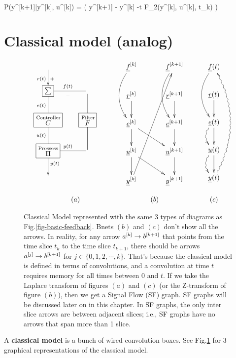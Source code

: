 \beq\color{blue}
P(y^{[k+1]}|y^{[k]}, u^{[k]})
=
\delta(\quad
y^{[k+1]}
- y^{[k]} -\Delta t F_2(y^{[k]}, u^{[k]}, t_k)
\quad)
\eeq




\section{Classical model (analog)}


\begin{figure}[h!]
$$
\begin{array}{ccc}
\xymatrix{
\ar[d]_{r(t)}^{+}
\\
*+[F]{\sum}
\ar@{-}[d]_{e(t)}
&\ar@{-}[l]^{-}_{f(t)}
\\
*+[F]{\stackrel{\rm Controller}{C}}
\ar@{-}[d]_{u(t)}
&
*+[F]{\stackrel{\rm Filter} {F}}
\ar@{-}[u]\ar@{-}[d]
&
\\
*+[F]{\stackrel{\rm Prossess} {\Pi}}
\ar@{-}[r]^{y(t)}
\ar[d]^{y(t)}
&\ar@{-}[u]
\\
&
}
&
\xymatrix@C=3pc{
\rvf^{[k]}\ar@/_1.5pc/[dd]
&
\rvf^{[k+1]}\ar@/_1.5pc/[dd]
\\
\rvr^{[k]}\ar[d]
&
\rvr^{[k+1]}\ar[d]
\\
\rve^{[k]}\ar[d]\ar[rd]
&
\rve^{[k+1]}\ar[d]
\\
\rvu^{[k]}\ar[d]\ar[rd]
&\rvu^{[k+1]}\ar[d]
\\
\rvy^{[k]}\ar[ruuuu]
&
\rvy^{[k+1]}
}
&\quad\quad
\xymatrix{
\rvf(t)\ar@/_1.5pc/[dd]
\\
\rvr(t)\ar[d]
\\
\rve(t)\ar[d]\ar@{~>}@/_1pc/[d]
\\
\rvu(t)\ar[d]\ar@{~>}@/_1pc/[d]
\\
\rvy(t)\ar@{~>}@/_2pc/[uuuu]
}
\\
\\
(a)& (b) &\quad\quad (c)
\end{array}
$$
\caption{
Classical Model
represented
with
the same 3
types of diagrams
as Fig.\ref{fig-basic-feedback}.
Bnets $(b)$ and $(c)$
don't
show all the arrows.
In reality,
for any arrow $a^{[k]}\rightarrow b^{[k+1]}$ that
points from the 
time slice $t_k$
to the time slice $t_{k+1}$,
there should 
be arrows 
$a^{[j]}\rightarrow b^{[k+1]}$
for $j\in\{0,1,2, \cdots, k
\}$.
That's because
the classical model is defined
in terms of convolutions,
and a convolution
at time $t$ requires
memory for all times
between 0 and $t$.
If we take
the Laplace transform
of figures $(a)$ and $(c)$ (or 
the Z-transform of figure $(b)$),
then we get a
Signal Flow (SF) graph. SF graphs will
be discussed later on in this chapter.
In SF graphs,
the only
inter slice arrows are between 
adjacent slices; i.e., SF graphs have
no arrows that 
span more than 1 slice.}
\label{fig-classic-model}
\end{figure}
A {\bf classical
model} is a bunch of
 wired convolution boxes.
 See Fig.\ref{fig-classic-model}
 for 3
 graphical
 representations of
 the classical model.
 

